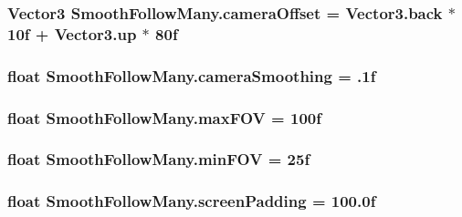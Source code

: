 \subsubsection[{\texorpdfstring{camera\+Offset}{cameraOffset}}]{\setlength{\rightskip}{0pt plus 5cm}Vector3 Smooth\+Follow\+Many.\+camera\+Offset = Vector3.\+back $\ast$ 10f + Vector3.\+up $\ast$ 80f}\hypertarget{class_smooth_follow_many_add023ea733aae2aa0c73689255c4f4fc}{}\label{class_smooth_follow_many_add023ea733aae2aa0c73689255c4f4fc}
\subsubsection[{\texorpdfstring{camera\+Smoothing}{cameraSmoothing}}]{\setlength{\rightskip}{0pt plus 5cm}float Smooth\+Follow\+Many.\+camera\+Smoothing = .\+1f}\hypertarget{class_smooth_follow_many_ab8aa84650ebd4e0f9f9da1afd3dbcd97}{}\label{class_smooth_follow_many_ab8aa84650ebd4e0f9f9da1afd3dbcd97}
\subsubsection[{\texorpdfstring{max\+F\+OV}{maxFOV}}]{\setlength{\rightskip}{0pt plus 5cm}float Smooth\+Follow\+Many.\+max\+F\+OV = 100f}\hypertarget{class_smooth_follow_many_a6093e1d87c9117313b73d6cc44ffbf20}{}\label{class_smooth_follow_many_a6093e1d87c9117313b73d6cc44ffbf20}
\subsubsection[{\texorpdfstring{min\+F\+OV}{minFOV}}]{\setlength{\rightskip}{0pt plus 5cm}float Smooth\+Follow\+Many.\+min\+F\+OV = 25f}\hypertarget{class_smooth_follow_many_a612a4233122f8e3bd8e9e5101f2dc687}{}\label{class_smooth_follow_many_a612a4233122f8e3bd8e9e5101f2dc687}
\subsubsection[{\texorpdfstring{screen\+Padding}{screenPadding}}]{\setlength{\rightskip}{0pt plus 5cm}float Smooth\+Follow\+Many.\+screen\+Padding = 100.\+0f}\hypertarget{class_smooth_follow_many_a6b1c50df0f7e9a41bf0a28cb1e4dc22c}{}\label{class_smooth_follow_many_a6b1c50df0f7e9a41bf0a28cb1e4dc22c}

